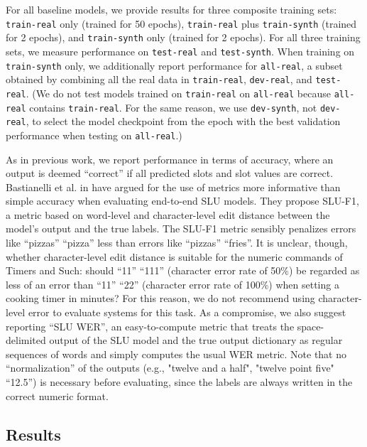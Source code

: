\documentclass{article}
\begin{document}
For all baseline models, we provide results for three composite training sets: \texttt{train-real} only (trained for 50 epochs), \texttt{train-real} plus \texttt{train-synth} (trained for 2 epochs), and \texttt{train-synth} only (trained for 2 epochs). For all three training sets, we measure performance on \texttt{test-real} and \texttt{test-synth}. When training on \texttt{train-synth} only, we additionally report performance for \texttt{all-real}, a subset obtained by combining all the real data in \texttt{train-real}, \texttt{dev-real}, and \texttt{test-real}. (We do not test models trained on \texttt{train-real} on \texttt{all-real} because \texttt{all-real} contains \texttt{train-real}. For the same reason, we use \texttt{dev-synth}, not \texttt{dev-real}, to select the model checkpoint from the epoch with the best validation performance when testing on \texttt{all-real}.)

As in previous work, we report performance in terms of accuracy, where an output is deemed ``correct'' if all predicted slots and slot values are correct. Bastianelli et al. in \cite{slurp} have argued for the use of metrics more informative than simple accuracy when evaluating end-to-end SLU models. They propose SLU-F1, a metric based on word-level and character-level edit distance between the model's output and the true labels. The SLU-F1 metric sensibly penalizes errors like ``pizzas''  ``pizza'' less than errors like ``pizzas''  ``fries''. It is unclear, though, whether character-level edit distance is suitable for the numeric commands of Timers and Such: should ``11''  ``111'' (character error rate of 50\%) be regarded as less of an error than ``11''  ``22'' (character error rate of 100\%) when setting a cooking timer in minutes? For this reason, we do not recommend using character-level error to evaluate systems for this task. As a compromise, we also suggest reporting ``SLU WER'', an easy-to-compute metric that treats the space-delimited output of the SLU model and the true output dictionary as regular sequences of words and simply computes the usual WER metric. Note that no ``normalization'' of the outputs (e.g., "twelve and a half", "twelve point five"  ``12.5'') is necessary before evaluating, since the labels are always written in the correct numeric format.

\subsection{Results}\label{results-text}
\end{document}
